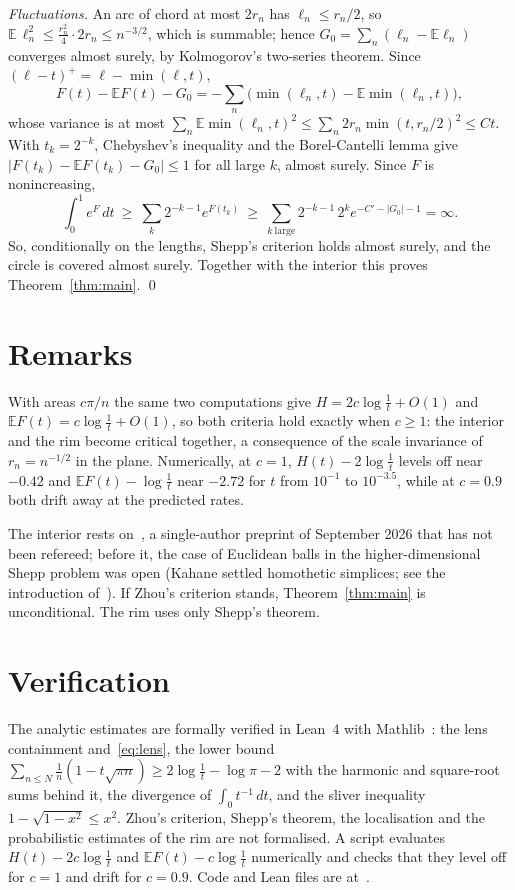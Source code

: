 \documentclass[11pt]{amsart}
\theoremstyle{remark}
\begin{document}
\emph{Fluctuations.} An arc of chord at most $2r_n$ has $\ell_n\le r_n/2$, so $\mathbb E\,\ell_n^2\le\frac{r_n^2}4\cdot2r_n\le n^{-3/2}$, which is summable; hence $G_0=\sum_n(\ell_n-\mathbb E\ell_n)$ converges almost surely, by Kolmogorov's two-series theorem. Since $(\ell-t)^+=\ell-\min(\ell,t)$,
\[
F(t)-\mathbb EF(t)-G_0=-\sum_n\bigl(\min(\ell_n,t)-\mathbb E\min(\ell_n,t)\bigr),
\]
whose variance is at most $\sum_n\mathbb E\min(\ell_n,t)^2\le\sum_n2r_n\min(t,r_n/2)^2\le Ct$. With $t_k=2^{-k}$, Chebyshev's inequality and the Borel-Cantelli lemma give $|F(t_k)-\mathbb EF(t_k)-G_0|\le1$ for all large $k$, almost surely. Since $F$ is nonincreasing,
\[
\int_0^1e^{F}\,dt\ \ge\ \sum_k2^{-k-1}e^{F(t_k)}\ \ge\ \sum_{k\ \text{large}}2^{-k-1}\,2^ke^{-C'-|G_0|-1}=\infty .
\]
So, conditionally on the lengths, Shepp's criterion holds almost surely, and the circle is covered almost surely. Together with the interior this proves Theorem~\ref{thm:main}. \qed

\section{Remarks}

With areas $c\pi/n$ the same two computations give $H=2c\log\frac1t+O(1)$ and $\mathbb EF(t)=c\log\frac1t+O(1)$, so both criteria hold exactly when $c\ge1$: the interior and the rim become critical together, a consequence of the scale invariance of $r_n=n^{-1/2}$ in the plane. Numerically, at $c=1$, $H(t)-2\log\frac1t$ levels off near $-0.42$ and $\mathbb EF(t)-\log\frac1t$ near $-2.72$ for $t$ from $10^{-1}$ to $10^{-3.5}$, while at $c=0.9$ both drift away at the predicted rates.

The interior rests on~\cite{Z}, a single-author preprint of September 2026 that has not been refereed; before it, the case of Euclidean balls in the higher-dimensional Shepp problem was open (Kahane settled homothetic simplices; see the introduction of~\cite{Z}). If Zhou's criterion stands, Theorem~\ref{thm:main} is unconditional. The rim uses only Shepp's theorem.

\section{Verification}

The analytic estimates are formally verified in Lean~4 with Mathlib~\cite{mathlib}: the lens containment and~\eqref{eq:lens}, the lower bound $\sum_{n\le N}\frac1n(1-t\sqrt{\pi n})\ge2\log\frac1t-\log\pi-2$ with the harmonic and square-root sums behind it, the divergence of $\int_0t^{-1}\,dt$, and the sliver inequality $1-\sqrt{1-x^2}\le x^2$. Zhou's criterion, Shepp's theorem, the localisation and the probabilistic estimates of the rim are not formalised. A script evaluates $H(t)-2c\log\frac1t$ and $\mathbb EF(t)-c\log\frac1t$ numerically and checks that they level off for $c=1$ and drift for $c=0.9$. Code and Lean files are at~\cite{repo}.
\end{document}
